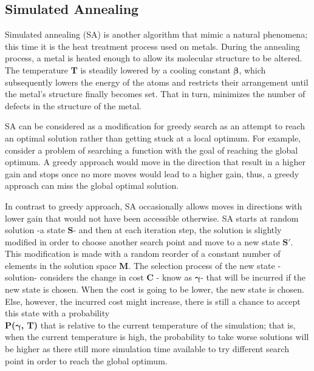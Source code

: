 \documentclass[twocolumn]{article}
\begin{document}
	\subsection{Simulated Annealing}
	Simulated annealing (SA) is another algorithm that mimic a natural phenomena; this time it is the heat treatment process used on metals. During the annealing process, a metal is heated enough to allow its molecular structure to be altered. The temperature {\bfseries T} is steadily lowered by a cooling constant {$\boldsymbol \beta$}, which subsequently lowers the energy of the atoms and restricts their arrangement until the metal's structure finally becomes set. That in turn, minimizes the number of defects in the structure of the metal.
	 
	SA can be considered as a modification for greedy search as an attempt to reach an optimal solution rather than getting stuck at a local optimum. For example, consider a problem of searching a function with the goal of reaching the global optimum. A greedy approach would move in the direction that result in a higher gain and stops once no more moves would lead to a higher gain, thus, a greedy approach can miss the global optimal solution.
	 
	In contrast to greedy approach, SA occasionally allows moves in directions with lower gain that would not have been accessible otherwise. SA starts at random solution -a state {\bfseries S}- and then at each iteration step, the solution is slightly modified in order to choose another search point and move to a new state $\boldsymbol{S\prime}$. This modification is made with a random reorder of a constant number of elements in the solution space {\bfseries M}. The selection process of the new state -solution- considers the change in cost {\bfseries C} - know as {$\boldsymbol \gamma$}- that will be incurred if the new state is chosen. When the cost is going to be lower, the new state is chosen. Else, however, the incurred cost might increase, there is still a chance to accept this state with a probability \\{\bfseries P({$\boldsymbol \gamma$}, T)} that is relative to the current temperature of the simulation; that is, when the current temperature is high, the probability to take worse solutions will be higher as there still more simulation time available to try different search point in order to reach the global optimum.
	 
\end{document}
